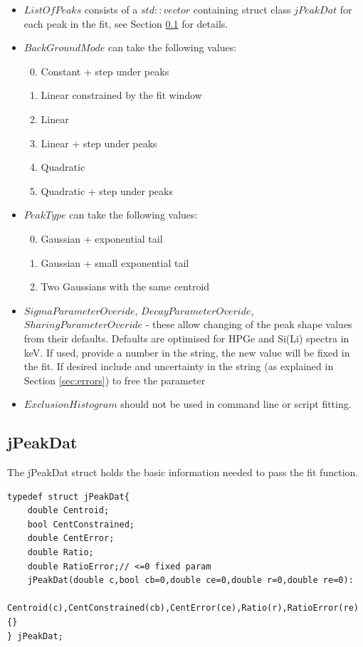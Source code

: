 \documentclass[a4paper,10pt]{article}
\begin{document}
\renewcommand{\labelenumi}{\arabic{enumi}}
\begin{itemize}
	\item $ListOfPeaks$ consists of a $std::vector$ containing struct class $jPeakDat$ for each peak in the fit, see Section \ref{sec:jpeakdata} for details.
	\item $BackGroundMode$ can take the following values:
      \begin{enumerate}
      \setcounter{enumi}{-1}
      \item Constant + step under peaks
      \item Linear constrained by the fit window
      \item Linear
      \item Linear + step under peaks
      \item Quadratic
      \item Quadratic + step under peaks
      \end{enumerate}
    \item $PeakType$ can take the following values:
      \begin{enumerate}
      \setcounter{enumi}{-1}
      \item Gaussian + exponential tail
      \item Gaussian + small exponential tail
      \item Two Gaussians with the same centroid 
      \end{enumerate}
    \item $SigmaParameterOveride$, $DecayParameterOveride$, $SharingParameterOveride$ - these allow changing of the peak shape values from their defaults. Defaults are optimised for HPGe and Si(Li) spectra in keV. If used, provide a number in the string, the new value will be fixed in the fit. If desired include and uncertainty in the string (as explained in Section \ref{sec:errors}) to free the parameter
    \item $ExclusionHistogram$ should not be used in command line or script fitting.   
\end{itemize}

\subsection{jPeakDat}\label{sec:jpeakdata}
The jPeakDat struct holds the basic information needed to pass the fit function.
\lstset{language=C++}
\begin{lstlisting}
typedef struct jPeakDat{
	double Centroid;
	bool CentConstrained;
	double CentError;
	double Ratio;
	double RatioError;// <=0 fixed param
	jPeakDat(double c,bool cb=0,double ce=0,double r=0,double re=0):
	Centroid(c),CentConstrained(cb),CentError(ce),Ratio(r),RatioError(re){}
} jPeakDat;
\end{lstlisting}
\end{document}
